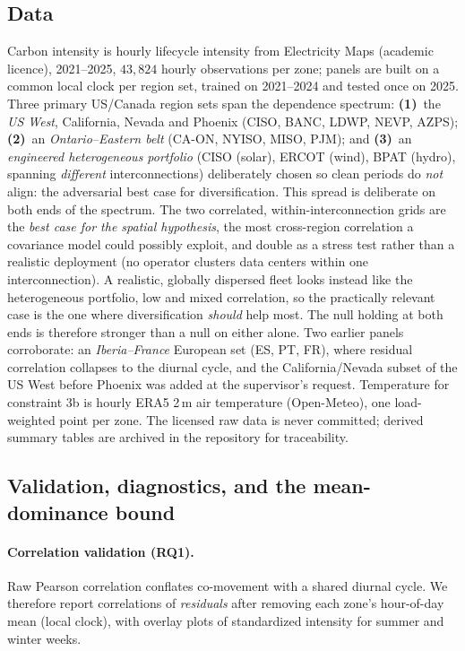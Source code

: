 \documentclass[10pt,twocolumn]{article}
\begin{document}
\subsection{Data}\label{sec:data}
Carbon intensity is hourly lifecycle intensity from Electricity Maps (academic
licence), 2021--2025, $43{,}824$ hourly observations per zone; panels are built on a
common local clock per region set, trained on 2021--2024 and tested once on 2025.
Three primary US/Canada region sets span the dependence spectrum:
\textbf{(1)}~the \emph{US West}, California, Nevada and Phoenix (CISO, BANC,
LDWP, NEVP, AZPS); \textbf{(2)}~an \emph{Ontario--Eastern belt} (CA-ON, NYISO,
MISO, PJM); and \textbf{(3)}~an \emph{engineered heterogeneous portfolio} (CISO
(solar), ERCOT (wind), BPAT (hydro), spanning \emph{different} interconnections)
deliberately chosen so clean periods do \emph{not} align: the adversarial best case
for diversification. This spread is deliberate on both ends of the spectrum. The two
correlated, within-interconnection grids are the \emph{best case for the spatial
hypothesis}, the most cross-region correlation a covariance model could possibly
exploit, and double as a stress test rather than a realistic deployment (no operator
clusters data centers within one interconnection). A realistic, globally dispersed
fleet looks instead like the heterogeneous portfolio, low and mixed correlation, so
the practically relevant case is the one where diversification \emph{should} help
most. The null holding at both ends is therefore stronger than a null on either alone.
Two earlier panels
corroborate: an \emph{Iberia--France} European set (ES, PT, FR), where residual
correlation collapses to the diurnal cycle, and the California/Nevada subset of the
US West before Phoenix was added at the supervisor's request. Temperature for
constraint 3b is hourly ERA5 2\,m air temperature (Open-Meteo), one load-weighted
point per zone. The licensed raw data is never committed; derived summary tables
are archived in the repository for traceability.

\subsection{Validation, diagnostics, and the mean-dominance bound}\label{sec:diagnostics}
\paragraph{Correlation validation (RQ1).} Raw Pearson correlation conflates
co-movement with a shared diurnal cycle. We therefore report correlations of
\emph{residuals} after removing each zone's hour-of-day mean (local clock), with
overlay plots of standardized intensity for summer and winter weeks.
\end{document}
